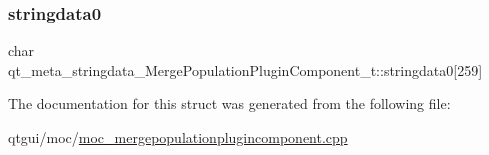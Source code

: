 \subsubsection{\texorpdfstring{stringdata0}{stringdata0}}
{\footnotesize\ttfamily char qt\+\_\+meta\+\_\+stringdata\+\_\+\+Merge\+Population\+Plugin\+Component\+\_\+t\+::stringdata0\mbox{[}259\mbox{]}}



The documentation for this struct was generated from the following file\+:\begin{DoxyCompactItemize}
\item 
qtgui/moc/\mbox{\hyperlink{moc__mergepopulationplugincomponent_8cpp}{moc\+\_\+mergepopulationplugincomponent.\+cpp}}\end{DoxyCompactItemize}
